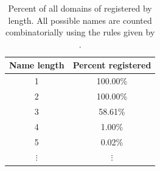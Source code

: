 \begin{table}
\begin{tabular}{c | c}
Name length      & Percent registered \\ \hline
1                & 100.00\%              \\
2                & 100.00\%              \\
3                & 58.61\%               \\
4                & 1.00\%                \\
5                & 0.02\%               \\
$\vdots$         & $\vdots$         
\end{tabular}
\caption{Percent of all domains of registered by length. All possible names are counted combinatorially using the rules given by \cite{bitdnsspec}.}
\label{table:names_available}
\end{table}
